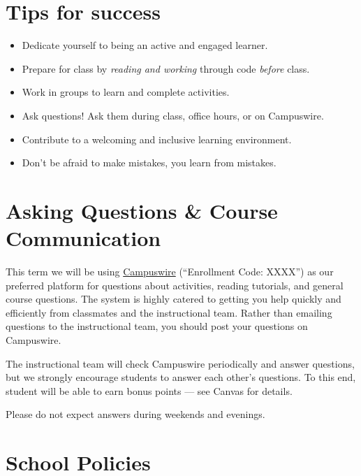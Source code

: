 \documentclass[
  letterpaper,
  DIV=11,
  numbers=noendperiod]{scrreprt}
\providecommand{\tightlist}{%
  \setlength{\itemsep}{0pt}\setlength{\parskip}{0pt}}\usepackage{longtable,booktabs,array}
\begin{document}
\hypertarget{tips-for-success}{%
\section*{Tips for success}\label{tips-for-success}}


\begin{itemize}
\tightlist
\item
  Dedicate yourself to being an active and engaged learner.
\item
  Prepare for class by \emph{reading and working} through code
  \emph{before} class.
\item
  Work in groups to learn and complete activities.
\item
  Ask questions! Ask them during class, office hours, or on Campuswire.
\item
  Contribute to a welcoming and inclusive learning environment.
\item
  Don't be afraid to make mistakes, you learn from mistakes.
\end{itemize}

\hypertarget{asking-questions-course-communication}{%
\section*{Asking Questions \& Course
Communication}\label{asking-questions-course-communication}}


This term we will be using \href{https://campuswire.com}{Campuswire}
(``Enrollment Code: XXXX'') as our preferred platform for questions
about activities, reading tutorials, and general course questions. The
system is highly catered to getting you help quickly and efficiently
from classmates and the instructional team. Rather than emailing
questions to the instructional team, you should post your questions on
Campuswire.

The instructional team will check Campuswire periodically and answer
questions, but we strongly encourage students to answer each other's
questions. To this end, student will be able to earn bonus points ---
see Canvas for details.

Please do not expect answers during weekends and evenings.

\hypertarget{school-policies}{%
\section*{School Policies}\label{school-policies}}
\end{document}
